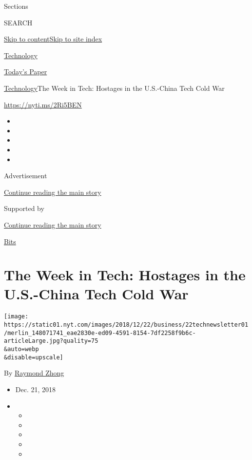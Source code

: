 Sections

SEARCH

\protect\hyperlink{site-content}{Skip to
content}\protect\hyperlink{site-index}{Skip to site index}

\href{https://www.nytimes.com/section/technology}{Technology}

\href{https://myaccount.nytimes.com/auth/login?response_type=cookie\&client_id=vi}{}

\href{https://www.nytimes.com/section/todayspaper}{Today's Paper}

\href{/section/technology}{Technology}\textbar{}The Week in Tech:
Hostages in the U.S.-China Tech Cold War

\url{https://nyti.ms/2Ri5BEN}

\begin{itemize}
\item
\item
\item
\item
\item
\end{itemize}

Advertisement

\protect\hyperlink{after-top}{Continue reading the main story}

Supported by

\protect\hyperlink{after-sponsor}{Continue reading the main story}

\href{/column/bits}{Bits}

\hypertarget{the-week-in-tech-hostages-in-the-us-china-tech-cold-war}{%
\section{The Week in Tech: Hostages in the U.S.-China Tech Cold
War}\label{the-week-in-tech-hostages-in-the-us-china-tech-cold-war}}

\texttt{[image: https://static01.nyt.com/images/2018/12/22/business/22technewsletter01/merlin\_148071741\_eae2830e-ed09-4591-8154-7df2258f9b6c-articleLarge.jpg?quality=75\\\&auto=webp\\\&disable=upscale]}

By \href{https://www.nytimes.com/by/raymond-zhong}{Raymond Zhong}

\begin{itemize}
\item
  Dec. 21, 2018
\item
  \begin{itemize}
  \item
  \item
  \item
  \item
  \item
  \end{itemize}
\end{itemize}

